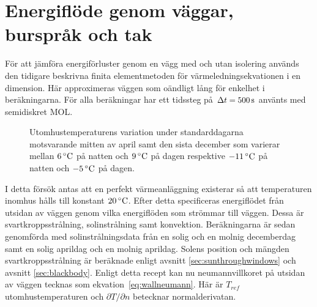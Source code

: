 \section{Energiflöde genom väggar, burspråk och tak}

För att jämföra energiförluster genom en vägg med och utan isolering används
den tidigare beskrivna finita elementmetoden för värmeledningsekvationen i en dimension. Här approximeras
väggen som oändligt lång för enkelhet i beräkningarna. För alla beräkningar har ett tidssteg
på $\Delta t = \unit[500]{s}$ använts med semidiskret MOL.

\begin{figure}[hpbt]
\centering

\vspace{1cm}

\caption{\label{fig:temperaturedist} Utomhustemperaturens variation under standarddagarna motsvarande mitten av april samt den sista december som varierar mellan $\unit[6]{^\circ C}$ på natten och $\unit[9]{^\circ C}$ på dagen respektive $\unit[-11]{^\circ C}$ på natten och $\unit[-5]{^\circ C}$ på dagen.
}
\end{figure}


I detta försök antas att en perfekt värmeanläggning
existerar så att temperaturen inomhus hålls till konstant $\unit[20]{^\circ C}$. Efter detta specificeras energiflödet
från utsidan av väggen genom vilka energiflöden som strömmar till väggen. Dessa är svartkroppsstrålning, solinstrålning
samt konvektion. Beräkningarna är sedan genomförda med solinstrålningsdata från en solig och en molnig decemberdag samt
en solig aprildag och en molnig aprildag. Solens position och mängden svartkroppsstrålning är beräknade enligt avsnitt
\ref{sec:sunthroughwindows} och avsnitt \ref{sec:blackbody}. Enligt detta recept kan nu neumannvillkoret
på utsidan av väggen tecknas som ekvation~\eqref{eq:wallneumann}. Här är $T_{ref}$ utomhustemperaturen
och $\partial T/\partial n$ betecknar normalderivatan.


